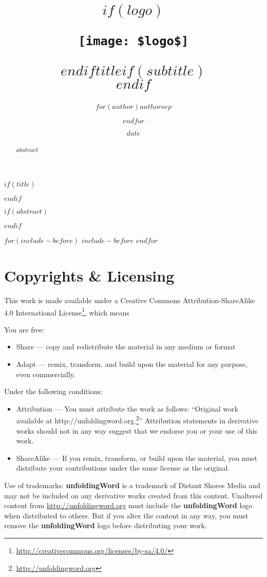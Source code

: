 \documentclass[$if(fontsize)$$fontsize$,$endif$$if(lang)$$lang$,$endif$$if(papersize)$$papersize$,$endif$$for(classoption)$$classoption$$sep$,$endfor$,openany]{$documentclass$}
\title{$if(logo)$\begin{center}\texttt{[image: \$logo\$]}\end{center}\vspace{\baselineskip}$endif$\Huge $title$$if(subtitle)$\\\vspace{0.5em}{\Large $subtitle$}$endif$}
\author{$for(author)$$author$$sep$ \and $endfor$}
\date{\small $date$}
\renewcommand{\href}[2]{#2\footnote{\url{#1}}}
\begin{document}

$if(title)$
  \maketitle
$endif$

$if(abstract)$
  \begin{abstract}
    $abstract$
  \end{abstract}
$endif$

\newpage
{}

$for(include-before)$
  $include-before$
$endfor$

\section{Copyrights \& Licensing}\label{copyrights-licensing}

This work is made available under a
\href{http://creativecommons.org/licenses/by-sa/4.0/}{Creative Commons
Attribution-ShareAlike 4.0 International License}, which means

You are free:

\begin{itemize}
\item
  Share --- copy and redistribute the material in any medium or format
\item
  Adapt --- remix, transform, and build upon the material for any
  purpose, even commercially.
\end{itemize}

Under the following conditions:

\begin{itemize}
\item
  Attribution --- You must attribute the work as follows: ``Original
  work available at
  \href{http://unfoldingword.org}{http://unfoldingword.org.}''
  Attribution statements in derivative works should not in any way
  suggest that we endorse you or your use of this work.
\item
  ShareAlike --- If you remix, transform, or build upon the material,
  you must distribute your contributions under the same license as the
  original.
\end{itemize}

Use of trademarks: \textbf{unfoldingWord} is a trademark of Distant
Shores Media and may not be included on any derivative works created
from this content. Unaltered content from \url{http://unfoldingword.org}
must include the \textbf{unfoldingWord} logo when distributed to others.
But if you alter the content in any way, you must remove the
\textbf{unfoldingWord} logo before distributing your work.
\end{document}

